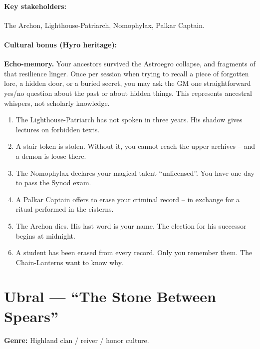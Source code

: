 \paragraph{Key stakeholders:} The Archon, Lighthouse-Patriarch, Nomophylax, Palkar Captain.

\paragraph{Cultural bonus (Hyro heritage):} \textbf{Echo-memory.} Your ancestors survived the Astroegro collapse, and fragments of that resilience linger. Once per session when trying to recall a piece of forgotten lore, a hidden door, or a buried secret, you may ask the GM one straightforward yes/no question about the past or about hidden things. This represents ancestral whispers, not scholarly knowledge.

\begin{tcolorbox}[colback=gray!5!white, colframe=gray!70!black, title=Thepyrgos Mini-Generator (d6),breakable]
\begin{enumerate}
\item The Lighthouse-Patriarch has not spoken in three years. His shadow gives lectures on forbidden texts.
\item A stair token is stolen. Without it, you cannot reach the upper archives -- and a demon is loose there.
\item The Nomophylax declares your magical talent ``unlicensed''. You have one day to pass the Synod exam.
\item A Palkar Captain offers to erase your criminal record -- in exchange for a ritual performed in the cisterns.
\item The Archon dies. His last word is your name. The election for his successor begins at midnight.
\item A student has been erased from every record. Only you remember them. The Chain-Lanterns want to know why.
\end{enumerate}
\end{tcolorbox}

\section{Ubral --- ``The Stone Between Spears''}
\textbf{Genre:} Highland clan / reiver / honor culture.

